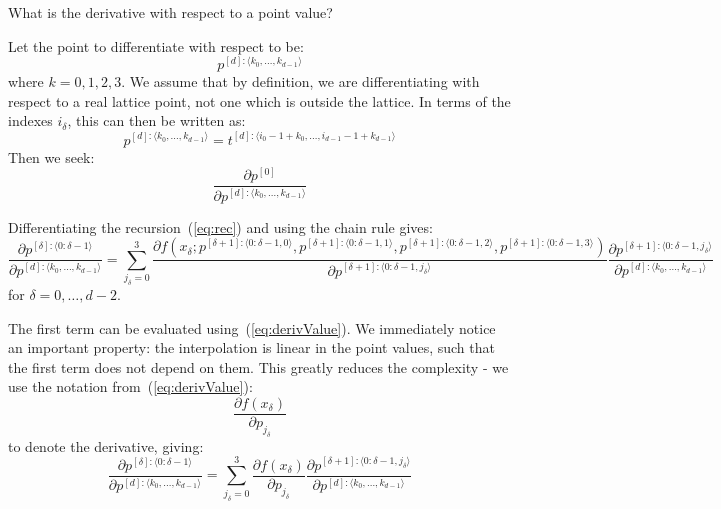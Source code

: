 \documentclass[11pt]{article}
\begin{document}

What is the derivative with respect to a point value? 

Let the point to differentiate with respect to be:
\begin{equation}
p^{[d]: \langle k_0, \dots, k_{d-1} \rangle}
\end{equation}
where $k=0,1,2,3$. We assume that by definition, we are differentiating with respect to a real lattice point, not one which is outside the lattice. In terms of the indexes $i_\delta$, this can then be written as:
\begin{equation}
p^{[d]: \langle k_0, \dots, k_{d-1} \rangle} = t^{[d]: \langle i_0-1+k_0, \dots, i_{d-1}-1+k_{d-1} \rangle}
\end{equation}
Then we seek:
\begin{equation}
\frac{\partial p^{[0]}}{\partial p^{[d]: \langle k_0, \dots, k_{d-1} \rangle}}
\end{equation}

Differentiating the recursion~(\ref{eq:rec}) and using the chain rule gives:
\begin{equation}
\frac{\partial p^{[\delta]: \langle 0:\delta-1 \rangle} }{\partial p^{[d]: \langle k_0, \dots, k_{d-1} \rangle}} = \sum_{j_\delta=0}^3 
\frac{ \partial f \left ( 
x_{\delta} ; 
p^{[\delta+1]: \langle 0:\delta-1,0 \rangle},
p^{[\delta+1]: \langle 0:\delta-1,1 \rangle},
p^{[\delta+1]: \langle 0:\delta-1,2 \rangle},
p^{[\delta+1]: \langle 0:\delta-1,3 \rangle}
\right ) 
}{
\partial p^{[\delta+1]: \langle 0:\delta-1,j_\delta \rangle}
}
\frac{\partial p^{[\delta+1]: \langle 0:\delta-1,j_\delta \rangle}
}{
\partial p^{[d]: \langle k_0, \dots, k_{d-1} \rangle}
}
\end{equation}
for $\delta = 0,\dots,d-2$.

The first term can be evaluated using~(\ref{eq:derivValue}). We immediately notice an important property: the interpolation is linear in the point values, such that the first term does not depend on them. This greatly reduces the complexity - we use the notation from~(\ref{eq:derivValue}):
\begin{equation}
\frac{ 
\partial f(x_\delta)
}{
\partial p_{j_\delta}
}
\end{equation}
to denote the derivative, giving:
\begin{equation}
\frac{\partial p^{[\delta]: \langle 0:\delta-1 \rangle} }{\partial p^{[d]: \langle k_0, \dots, k_{d-1} \rangle}} 
= 
\sum_{j_\delta=0}^3 
\frac{
\partial f(x_\delta)
}{
\partial p_{j_\delta}
}
\frac{\partial p^{[\delta+1]: \langle 0:\delta-1,j_\delta \rangle}
}{
\partial p^{[d]: \langle k_0, \dots, k_{d-1} \rangle}
}
\label{eq:recDerivP}
\end{equation}
\end{document}
